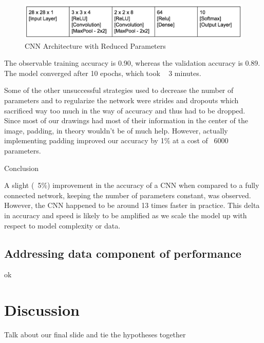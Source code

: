 \documentclass[12pt]{article}
\begin{document}
\begin{figure}
  \begin{center}
    \includegraphics[scale=0.5]{fig4}
  \end{center}
  \caption{CNN Architecture with Reduced Parameters}
  \label{fig:cnnArchPool}
\end{figure}

The observable training accuracy is 0.90, whereas the validation accuracy is
0.89. The model converged after 10 epochs, which took ~ 3 minutes.

Some of the other unsuccessful strategies used to decrease the number of
parameters and to regularize the network were strides and dropouts which
sacrificed way too much in the way of accuracy and thus had to be dropped.
Since most of our drawings had most of their information in the center of the
image, padding, in theory wouldn’t be of much help. However, actually
implementing padding improved our accuracy by 1\% at a cost of ~6000
parameters.

Conclusion

A slight (~5\%) improvement in the accuracy of a CNN when compared to a fully connected network, keeping the number of parameters constant, was observed. However, the CNN happened to be around 13 times faster in practice. This delta in accuracy and speed is likely to be amplified as we scale the model up with respect to model complexity or data.

\subsection{Addressing data component of performance}

ok

\section{Discussion}

Talk about our final slide and tie the hypotheses together





\end{document}
